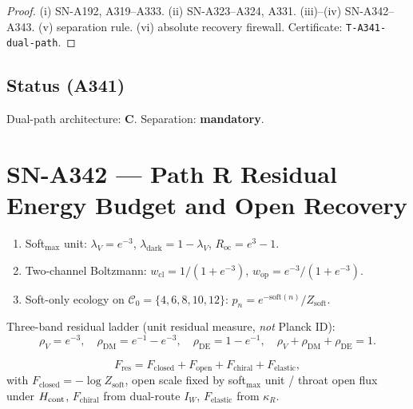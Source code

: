 \begin{proof}
(i) SN-A192, A319--A333. (ii) SN-A323--A324, A331. (iii)--(iv) SN-A342--A343. (v) separation rule. (vi) absolute recovery firewall. Certificate: \texttt{T-A341-dual-path}.
\end{proof}

\subsection*{Status (A341)}
Dual-path architecture: \textbf{C}. Separation: \textbf{mandatory}.

\section{SN-A342 --- Path R Residual Energy Budget and Open Recovery}
\label{sec:SN-A342}

\begin{definition}
\label{def:A342-layers}
\begin{enumerate}[label=(L\arabic*)]
\item Soft$_{\max}$ unit: $\lambda_V=e^{-3}$, $\lambda_{\mathrm{dark}}=1-\lambda_V$, $R_{\mathrm{oc}}=e^{3}-1$.
\item Two-channel Boltzmann: $w_{\mathrm{cl}}=1/(1+e^{-3})$, $w_{\mathrm{op}}=e^{-3}/(1+e^{-3})$.
\item Soft-only ecology on $\mathcal{C}_0=\{4,6,8,10,12\}$: $p_n=e^{-\mathrm{soft}(n)}/Z_{\mathrm{soft}}$.
\end{enumerate}
Three-band residual ladder (unit residual measure, \emph{not} Planck ID):
\begin{equation}
\rho_V=e^{-3},
\quad
\rho_{\mathrm{DM}}=e^{-1}-e^{-3},
\quad
\rho_{\mathrm{DE}}=1-e^{-1},
\quad
\rho_V+\rho_{\mathrm{DM}}+\rho_{\mathrm{DE}}=1.
\end{equation}
\end{definition}

\begin{definition}
\label{def:A342-F}
\begin{equation}
F_{\mathrm{res}}
=
F_{\mathrm{closed}}+F_{\mathrm{open}}+F_{\mathrm{chiral}}+F_{\mathrm{elastic}},
\end{equation}
with $F_{\mathrm{closed}}=-\log Z_{\mathrm{soft}}$, open scale fixed by soft$_{\max}$ unit / throat open flux under $H_{\rm cont}$, $F_{\mathrm{chiral}}$ from dual-route $I_W$, $F_{\mathrm{elastic}}$ from $\kappa_R$.
\end{definition}

